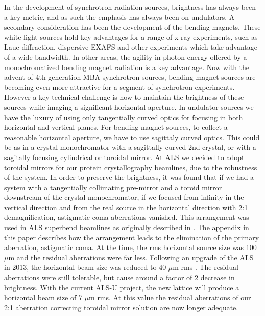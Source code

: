 \documentclass{iucr}              %
\newcommand{\inblue}[1]{{\color{blue}#1}}
\begin{document}
In the development of synchrotron radiation sources, brightness has always been a key metric, and as such the emphasis has always been on undulators.  A secondary consideration has been the development of the bending magnets. These white light sources hold key advantages for a range of x-ray experiments, such as Laue diffraction, dispersive EXAFS and other experiments which take advantage of a wide bandwidth.  In other areas, the agility in photon energy offered by a monochromatized bending magnet radiation is a key advantage.  Now with the advent of 4th generation MBA synchrotron sources, bending magnet sources are becoming even more attractive for a segment of synchrotron experiments.  However a key technical challenge is how to maintain the brightness of these sources while imaging a significant horizontal aperture.  In undulator sources we have the luxury of using only tangentially curved optics for focusing in both horizontal and vertical planes.  For bending magnet sources, to collect a reasonable horizontal aperture, we have to use sagittaly curved optics.  This could be as in a crystal monochromator with a sagittally curved 2nd crystal, or with a sagitally focusing cylindrical or toroidal mirror.  At ALS we decided to adopt toroidal mirrors for our protein crystallography beamlines, due to the robustness of the system.  In order to preserve the brightness, it was found that if we had a system with a tangentially collimating pre-mirror and a toroid mirror downstream of the crystal monochromator, if we focused from infinity in the vertical direction and from the real source in the horizontal direction with 2:1 demagnification,  astigmatic coma aberrations vanished. \inblue{This arrangement was used in ALS superbend beamlines as originally described in  \cite{McKinney2000}. The appendix in this paper describes how the arrangement leads to the elimination of the primary aberration, astigmatic coma.} At the time, the rms horizontal source size was 100 $\mu$m and the residual aberrations were far less.  Following an upgrade of the ALS in 2013, the horizontal beam size was reduced to 40 $\mu$m  rms \cite{Steier_2014}. The residual aberrations were still tolerable, but cause around a factor of 2 decrease in brightness.  With the current ALS-U project, the new lattice will produce a horizontal beam size of 7 $\mu$m rms.  At this value the residual aberrations of our 2:1 aberration correcting toroidal mirror solution are now longer adequate.
\end{document}
